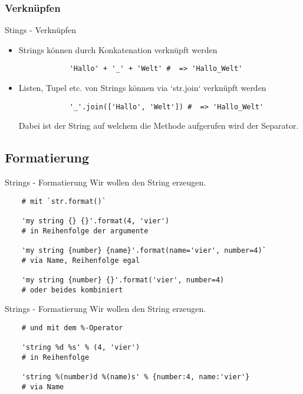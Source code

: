 \subsubsection{Verknüpfen}
\begin{frame}[fragile]{Stings - Verknüpfen}
	\begin{itemize}
	    \item Strings können durch Konkatenation verknüpft werden \\
	    \begin{lstlisting}
			'Hallo' + '_' + 'Welt' #  => 'Hallo_Welt'
		\end{lstlisting}  
	    \item Listen, Tupel etc. von Strings können via `str.join` verknüpft werden \\
	    \begin{lstlisting}
			'_'.join(['Hallo', 'Welt']) #  => 'Hallo_Welt'
		\end{lstlisting}
	    Dabei ist der String auf welchem die Methode aufgerufen wird der Separator.
	\end{itemize}
\end{frame}


\subsection{Formatierung}
\begin{frame}[fragile]{Strings - Formatierung}
	Wir wollen den String  erzeugen.

	\begin{lstlisting}
	# mit `str.format()`  

	'my string {} {}'.format(4, 'vier')
	# in Reihenfolge der argumente

	'my string {number} {name}'.format(name='vier', number=4)`
	# via Name, Reihenfolge egal

	'my string {number} {}'.format('vier', number=4)
	# oder beides kombiniert
	\end{lstlisting}
\end{frame}

\begin{frame}[fragile]{Strings - Formatierung}
	Wir wollen den String  erzeugen.
	\begin{lstlisting}
	# und mit dem %-Operator

	'string %d %s' % (4, 'vier')
	# in Reihenfolge

	'string %(number)d %(name)s' % {number:4, name:'vier'}
	# via Name
	\end{lstlisting}
\end{frame}





